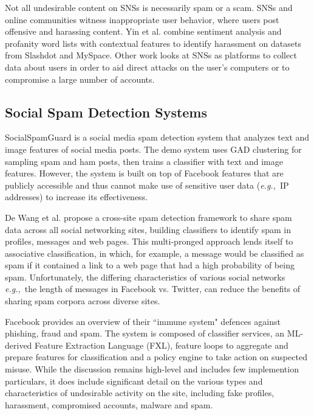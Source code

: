 \documentclass[preprint]{acm_proc_article-sp}
\newcommand{\eg}{{\em e.g.,}~}
\begin{document}
Not all undesirable content on SNSs is necessarily spam or a scam. SNSs and online communities witness inappropriate user behavior, where users post offensive and harassing content. Yin et al. \cite{yin} combine sentiment analysis and profanity word lists with contextual features to identify harassment on datasets from Slashdot and MySpace. Other work looks at SNSs as platforms to collect data about users in order to aid direct attacks on the user's computers or to compromise a large number of accounts. \cite{patsakis, huber}

\subsection{Social Spam Detection Systems}

SocialSpamGuard \cite{jin} is a social media spam detection system that analyzes text and image features of social media posts. The demo system uses GAD clustering \cite{jingad} for sampling spam and ham posts, then trains a classifier with text and image features. However, the system is built on top of Facebook features that are publicly accessible and thus cannot make use of sensitive user data (\eg IP addresses) to increase its effectiveness. 

De Wang et al. \cite{wang} propose a cross-site spam detection framework to share spam data across all social networking sites, building classifiers to identify spam in profiles, messages and web pages. This multi-pronged approach lends itself to associative classification, in which, for example, a message would be classified as spam if it contained a link to a web page that had a high probability of being spam. Unfortunately, the differing characteristics of various social networks \eg the length of messages in Facebook vs. Twitter, can reduce the benefits of sharing spam corpora across diverse sites.

Facebook \cite{stein} provides an overview of their ``immune system" defences against phishing, fraud and spam. The system is composed of classifier services, an ML-derived Feature Extraction Language (FXL), feature loops to aggregate and prepare features for classification and a policy engine to take action on suspected misuse. While the discussion remains high-level and includes few implemention particulars, it does include significant detail on the various types and characteristics of undesirable activity on the site, including fake profiles, harassment, compromised accounts, malware and spam. 
\end{document}
